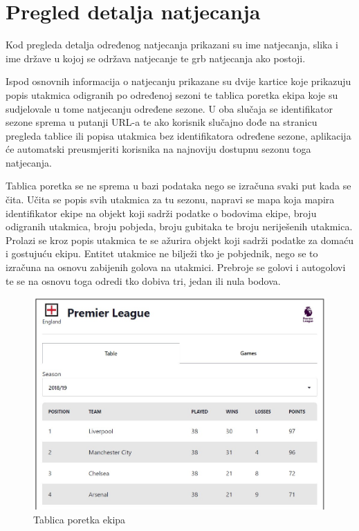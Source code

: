 \documentclass[times, utf8, zavrsni]{fer}
\begin{document}
\section{Pregled detalja natjecanja}

Kod pregleda detalja određenog natjecanja prikazani su ime natjecanja, slika i ime države u kojoj se održava natjecanje te grb natjecanja ako postoji.

Ispod osnovnih informacija o natjecanju prikazane su dvije kartice koje prikazuju popis utakmica odigranih po određenoj sezoni te tablica poretka ekipa koje su sudjelovale u tome natjecanju određene sezone.
U oba slučaja se identifikator sezone sprema u putanji URL-a te ako korisnik slučajno dođe na stranicu pregleda tablice ili popisa utakmica bez identifikatora određene sezone, aplikacija će automatski preusmjeriti korisnika na najnoviju dostupnu sezonu toga natjecanja.

Tablica poretka se ne sprema u bazi podataka nego se izračuna svaki put kada se čita.
Učita se popis svih utakmica za tu sezonu, napravi se mapa koja mapira identifikator ekipe na objekt koji sadrži podatke o bodovima ekipe, broju odigranih utakmica, broju pobjeda, broju gubitaka te broju neriješenih utakmica.
Prolazi se kroz popis utakmica te se ažurira objekt koji sadrži podatke za domaću i gostujuću ekipu.
Entitet utakmice ne bilježi tko je pobjednik, nego se to izračuna na osnovu zabijenih golova na utakmici. Prebroje se golovi i autogolovi te se na osnovu toga odredi tko dobiva tri, jedan ili nula bodova.

\begin{figure}[htb]
\centering
\includegraphics[width=14cm]{images/table.jpg}
\caption{Tablica poretka ekipa}
\label{fig:table}
\end{figure}
\end{document}
